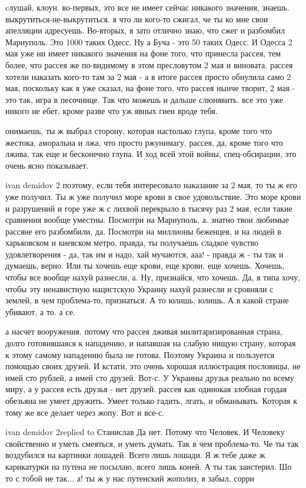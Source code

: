 cлушай, клоун. во-первых, это все не имеет сейчас никакого значения, знаешь.
выкрутиться-не-выкрутиться. я что ли кого-то сжигал, че ты ко мне свои
апелляции адресуешь. Во-вторых, я зато отлично знаю, что сжег и разбомбил
Мариуполь. Это 1000 таких Одесс. Ну а Буча - это 50 таких Одесс. И Одесса 2 мая
уже ни имеет никакого значения на фоне того, что принесла рассея, тем более,
что рассея же по-видимому в этом пресловутом 2 мая и виновата. рассея хотели
наказать кого-то там за 2 мая - а в итоге рассея просто обнулила само 2 мая,
поскольку как я уже сказал, на фоне того, что рассея нынче творит, 2 мая - это
так, игра в песочнице. Так что можешь и дальше слюнявить. все это уже никого не
ебет, кроме разве что уж явных гиен вроде тебя.


онимаешь, ты ж выбрал сторону, которая настолько глупа, кроме того что жестока,
аморальна и лжа, что просто ржунимагу. рассея, да, кроме того что лжива, так
еще и бесконечно глупа. И ход всей этой войны, спец-обсирации, это очень ясно
показывает.

ivan demidov 2 поэтому, если тебя интересовало наказание за 2 мая, то ты ж его
уже получил. Ты ж уже получил море крови в свое удовольствие. Это море крови и
разрушений и горе уже ж с лихвой перекрыло в тысячу раз 2 мая, если такие
сравнения вообще уместны. Посмотри на Мариуполь, а. знатно твои любимые рассяне
его разбомбили, да. Посмотри на миллионы беженцев, и на людей в харьковском и
киевском метро, правда, ты получаешь сладкое чувство удовлетворения - да, так
им и надо, хай мучаются, ааа! - правда ж - ты так и думаешь, верно. Или ты
хочешь еще крови, еще крови, еще хочешь. Хочешь, чтобы все вообще нахуй
разнесли, а. Ну, признайся, что хочешь. Да, я типа хочу, чтобы эту ненавистную
нацистскую Украину нахуй разнесли и сровняли с землей, в чем проблема-то,
признаться. А то юлишь, юлишь. А в какой стране убивают, а то. а се.

а насчет вооружения. потому что рассея лживая милитаризированная страна, долго
готовившаяся к нападению, и напавшая на слабую нищую страну, которая к этому
самому нападению была не готова. Поэтому Украина и пользуется помощью своих
друзей. И кстати, это очень хорошая иллюстрация пословицы, не имей сто рублей,
а имей сто друзей. Вот-с. У Украины друзья реально по всему миру, а у рассея
есть друзья - нет друзей. рассея как одинокая злобная гордая обезьяна не умеет
дружить. Умеет только гадить, лгать, и обманывать. Которая к тому же все делает
через жопу. Вот и все-с.

ivan demidov 2replied to Станислав Да нет. Потому что Человек. И Человеку
свойственно и уметь смеяться, и уметь думать. Так в чем проблема-то. Че ты так
воздубился на картинки лошадей. Всего лишь лошади. Я ж тебе даже ж карикатурки
на путена не посылаю, всего лишь коней. А ты так заистерил. Шо то с тобой не
так... а! ты ж у нас путенский жополиз, я забыл, сорри

